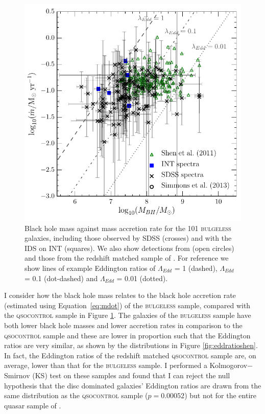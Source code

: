 {\begin{figure}
\centering
\includegraphics[width=\textwidth]{agn/mass_bh_mdot_with_all_errors_shen_11.pdf}
\caption[Black hole mass against mass accretion rate for the \textsc{bulgeless} sample]{Black hole mass against mass accretion rate for the 101 \textsc{bulgeless} galaxies, including those observed by SDSS (crosses) and with the IDS on INT (squares). We also show detections from \citet{Simmons13} (open circles) and those from the redshift matched sample of \citet[][open triangles]{shen11}. For reference we show lines of example Eddington ratios of $\Lambda_{Edd}$ = 1 (dashed),  $\Lambda_{Edd}$ = 0.1 (dot-dashed) and $\Lambda_{Edd}$ = 0.01 (dotted).
}
\label{fig:mbhvsbol}
\end{figure}


I consider how the black hole mass relates to the black hole accretion rate (estimated using Equation~\ref{eq:mdot}) of the \textsc{bulgeless} sample, compared with the \textsc{qsocontrol} sample in Figure \ref{fig:mbhvsbol}. The galaxies of the \textsc{bulgeless} sample have both lower black hole masses and lower accretion rates in comparison to the \textsc{qsocontrol} sample and these are lower in proportion such that the Eddington ratios are very similar, as shown by the distributions in Figure \ref{fig:eddratioshen}. In fact, the Eddington ratios of the redshift matched \textsc{qsocontrol} sample are, on average, lower than that for the \textsc{bulgeless} sample. I performed a Kolmogorov$-$Smirnov (KS) test on these samples and found that I can reject the null hypothesis that the disc dominated galaxies' Eddington ratios are drawn from the same distribution as the \textsc{qsocontrol} sample ($p=0.00052$) but not for the entire quasar sample of \citet[][$p=0.14$]{shen11}.

}
